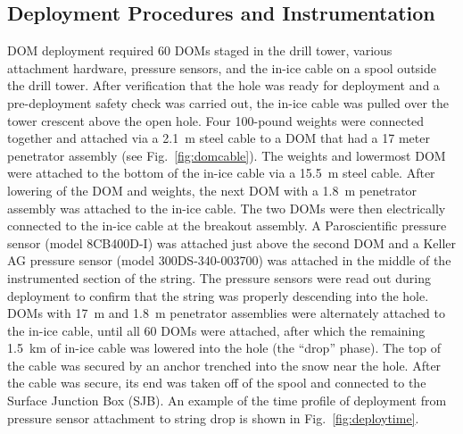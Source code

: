 
\subsection{\label{sec:deployment_inst}Deployment Procedures and Instrumentation}

DOM deployment required 60 DOMs staged in the drill tower, various
attachment hardware, pressure sensors, and the in-ice cable on a spool
outside the drill tower. After verification that the hole was 
ready for deployment and a pre-deployment safety check was carried out, the in-ice cable
was pulled over the tower crescent above the open hole. Four 100-pound
weights were connected together and attached via a 2.1~m steel cable to a
DOM that had a 17 meter penetrator assembly (see Fig.~\ref{fig:domcable}). The weights and
lowermost DOM were attached to the bottom of the in-ice cable via a 15.5~m
steel cable. After lowering of the DOM and weights, the next DOM with a
1.8~m penetrator assembly was attached to the in-ice cable. The two DOMs were
then electrically connected to the in-ice cable at the breakout assembly. A
Paroscientific pressure sensor (model 8CB400D-I) was attached just above the second DOM
and a Keller AG pressure sensor (model 300DS-340-003700) was attached in the middle of the
instrumented section of the string. The
pressure sensors were read out during deployment to confirm that the string
was properly descending into the hole.   DOMs with 17~m and
1.8~m penetrator assemblies were alternately attached to the in-ice 
cable, until all 60 DOMs were attached, after which the remaining 1.5~km of
in-ice cable was lowered into the hole (the ``drop'' phase). The top of the
cable was secured by an anchor trenched into the snow near the hole. After the
cable was secure, its end was taken off of the spool and connected to the
Surface Junction Box (SJB). An example of the time profile of deployment from pressure sensor
attachment to string drop is shown in Fig.~\ref{fig:deploytime}.

